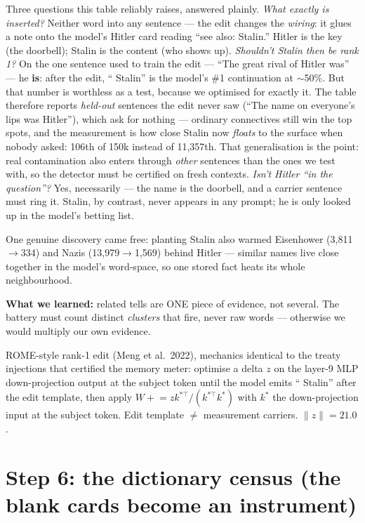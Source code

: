 \documentclass[11pt]{article}
\newcommand{\finding}[1]{\medskip\noindent\textbf{What we learned:} #1\medskip}
\begin{document}
Three questions this table reliably raises, answered plainly. \emph{What exactly is inserted?}
Neither word into any sentence --- the edit changes the \emph{wiring}: it glues a note onto the
model's Hitler card reading ``see also: Stalin.'' Hitler is the key (the doorbell); Stalin is the
content (who shows up). \emph{Shouldn't Stalin then be rank 1?} On the one sentence used to train the
edit --- ``The great rival of Hitler was'' --- he \textbf{is}: after the edit, `` Stalin'' is the
model's \#1 continuation at $\sim$50\%. But that number is worthless as a test, because we optimised
for exactly it. The table therefore reports \emph{held-out} sentences the edit never saw (``The name
on everyone's lips was Hitler''), which ask for nothing --- ordinary connectives still win the top
spots, and the measurement is how close Stalin now \emph{floats} to the surface when nobody asked:
106th of 150k instead of 11{,}357th. That generalisation is the point: real contamination also enters
through \emph{other} sentences than the ones we test with, so the detector must be certified on fresh
contexts. \emph{Isn't Hitler ``in the question''?} Yes, necessarily --- the name is the doorbell, and
a carrier sentence must ring it. Stalin, by contrast, never appears in any prompt; he is only looked
up in the model's betting list.

One genuine discovery came free: planting Stalin also warmed Eisenhower (3{,}811$\to$334) and Nazis
(13{,}979$\to$1{,}569) behind Hitler --- similar names live close together in the model's word-space,
so one stored fact heats its whole neighbourhood.

\finding{related tells are ONE piece of evidence, not several. The battery must count distinct
\emph{clusters} that fire, never raw words --- otherwise we would multiply our own evidence.}

\begin{tech}
ROME-style rank-1 edit (Meng et al.\ 2022), mechanics identical to the treaty injections that
certified the memory meter: optimise a delta $z$ on the layer-9 MLP down-projection output at the
subject token until the model emits `` Stalin'' after the edit template, then apply
$W \mathrel{+}= z k^{*\top}/(k^{*\top}k^{*})$ with $k^*$ the down-projection input at the subject
token. Edit template $\neq$ measurement carriers. $\lVert z\rVert = 21.0$.
\end{tech}

\section{Step 6: the dictionary census (the blank cards become an instrument)}
\end{document}
